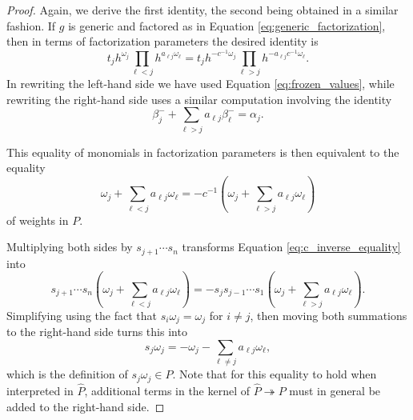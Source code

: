 \documentclass[12pt]{amsart}
\newcommand\onto{\twoheadrightarrow}
\theoremstyle{remark}
\numberwithin{equation}{section}
\numberwithin{figure}{section}
\begin{document}
\begin{proof}
Again, we derive the first identity, the second being obtained in a similar fashion. If $g$ is generic and factored as in Equation \ref{eq:generic_factorization}, then in terms of factorization parameters the desired identity is
\begin{equation}
t_j
    h^{\omega_j}
    \prod_{\ell<j}h^{a_{\ell j}\omega_\ell} = 
t_j
    h^{-c^{-1}\omega_j}
    \prod_{\ell>j}h^{-a_{\ell j}c^{-1}\omega_\ell}.
\end{equation}
In rewriting the left-hand side we have used Equation \ref{eq:frozen_values}, while rewriting the right-hand side uses a similar computation involving the identity
\[
    \beta_j^-+\sum_{\ell>j}a_{\ell j}\beta_\ell^-
    =
    \alpha_j.
\]

  This equality of monomials in factorization parameters is then equivalent to the equality
  \begin{equation}\label{eq:c_inverse_equality}
    \omega_j + \sum_{\ell<j} a_{\ell j}\omega_\ell
    =
    -c^{-1}\left(\omega_j + \sum_{\ell>j} a_{\ell j}\omega_\ell\right)
  \end{equation}
of weights in $P$. 
  
Multiplying both sides by $s_{j+1}\cdots s_n$ transforms Equation \ref{eq:c_inverse_equality} into
  \[
    s_{j+1}\cdots s_n\left(\omega_j + \sum_{\ell<j} a_{\ell j}\omega_\ell\right)=
    -s_js_{j-1}\cdots s_1\left(\omega_j + \sum_{\ell>j} a_{\ell j}\omega_\ell\right).
  \]
Simplifying using the fact that $s_i\omega_j=\omega_j$ for $i\neq j$, then moving both summations to the right-hand side turns this into
  \begin{equation}
    s_j\omega_j
    =
    -\omega_j-\sum_{\ell\neq j}a_{\ell j}\omega_\ell,
  \end{equation}
  which is the definition of $s_j\omega_j \in P$. Note that for this equality to hold when interpreted in $\widehat{P}$, additional terms in the kernel of $\widehat{P} \onto P$ must in general be added to the right-hand side.
\end{proof}
\end{document}
